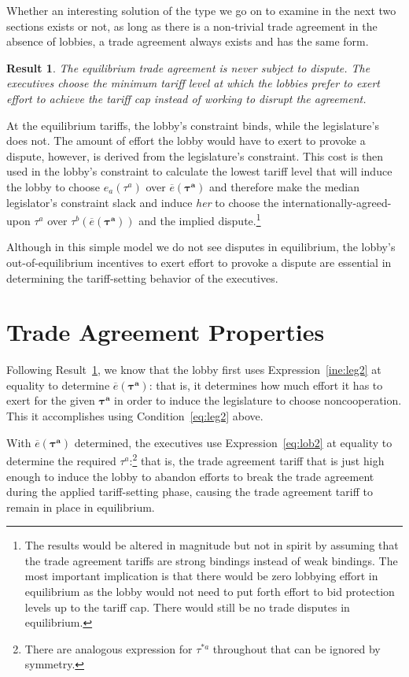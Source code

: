 \documentclass[authoryear, review]{elsarticle}
\newtheorem{result}{Result}
\newcommand{\ov}{\overline}
\newcommand{\bta}{\bm{\tau^a}}
\begin{document}
Whether an interesting solution of the type we go on to examine in the next two sections exists or not, as long as there is a non-trivial trade agreement in the absence of lobbies, a trade agreement always exists and has the same form.				

\begin{result}
  The equilibrium trade agreement is never subject to dispute. The executives choose the minimum tariff level at which the lobbies prefer to exert effort to achieve the tariff cap instead of working to disrupt the agreement.
  \label{res:eqm}
\end{result}
At the equilibrium tariffs, the lobby's constraint binds, while the legislature's does not. The amount of effort the lobby would have to exert to provoke a dispute, however, is derived from the legislature's constraint. This cost is then used in the lobby's constraint to calculate the lowest tariff level that will induce the lobby to choose $e_a(\tau^a)$ over $\ov{e}(\bta)$ and therefore make the median legislator's constraint slack and induce \textit{her} to choose the internationally-agreed-upon $\tau^a$ over $\tau^b(\ov{e}(\bta))$ and the implied dispute.\footnote{The results would be altered in magnitude but not in spirit by assuming that the trade agreement tariffs are strong bindings instead of weak bindings. The most important implication is that there would be zero lobbying effort in equilibrium as the lobby would not need to put forth effort to bid protection levels up to the tariff cap. There would still be no trade disputes in equilibrium.}

Although in this simple model we do not see disputes in equilibrium, the lobby's out-of-equilibrium incentives to exert effort to provoke a dispute are essential in determining the tariff-setting behavior of the executives.

\section{Trade Agreement Properties}
\label{sec:prop}
Following Result~\ref{res:eqm}, we know that the lobby first uses Expression~\ref{ine:leg2} at equality to determine $\ov{e}(\bta)$: that is, it determines how much effort it has to exert for the given $\bta$ in order to induce the legislature to choose noncooperation. This it accomplishes using Condition~\ref{eq:leg2} above.

With $\ov{e}(\bta)$ determined, the executives use Expression~\ref{eq:lob2} at equality to determine the required $\tau^a$:\footnote{There are analogous expression for $\tau^{*a}$ throughout that can be ignored by symmetry.} that is, the trade agreement tariff that is just high enough to induce the lobby to abandon efforts to break the trade agreement during the applied tariff-setting phase, causing the trade agreement tariff to remain in place in equilibrium.
\end{document}
